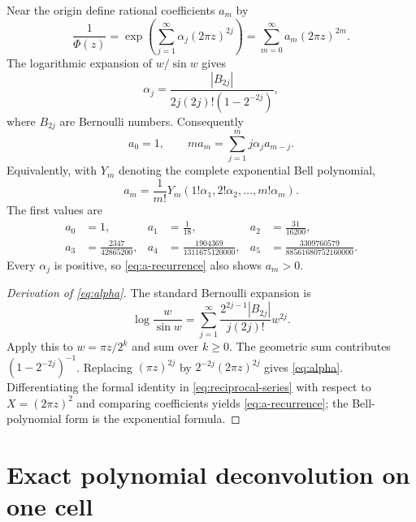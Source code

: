 \documentclass[11pt,oneside]{article}
\numberwithin{equation}{section}
\theoremstyle{definition}
\theoremstyle{remark}
\newcommand{\abs}[1]{\left|#1\right|}
\begin{document}
Near the origin define rational coefficients $a_m$ by
\begin{equation}
 \frac1{\Phi(z)}
 =\exp\!\left(\sum_{j=1}^{\infty}\alpha_j(2\pi z)^{2j}\right)
 =\sum_{m=0}^{\infty}a_m(2\pi z)^{2m}.
 \label{eq:reciprocal-series}
\end{equation}
The logarithmic expansion of $w/\sin w$ gives
\begin{equation}
 \alpha_j=\frac{\abs{B_{2j}}}
 {2j(2j)!\left(1-2^{-2j}\right)},
 \label{eq:alpha}
\end{equation}
where $B_{2j}$ are Bernoulli numbers.  Consequently
\begin{equation}
 a_0=1,
 \qquad
 ma_m=\sum_{j=1}^{m}j\alpha_j a_{m-j}.
 \label{eq:a-recurrence}
\end{equation}
Equivalently, with $Y_m$ denoting the complete exponential Bell polynomial,
\begin{equation}
 a_m=\frac1{m!}Y_m(1!\alpha_1,2!\alpha_2,\ldots,m!\alpha_m).
 \label{eq:a-Bell}
\end{equation}
The first values are
\begin{equation}
 \begin{aligned}
 a_0&=1,&
 a_1&=\frac1{18},&
 a_2&=\frac{31}{16200},\\
 a_3&=\frac{2347}{42865200},&
 a_4&=\frac{1904369}{1311675120000},&
 a_5&=\frac{3309760579}{88561680752160000}.
 \end{aligned}
 \label{eq:first-a}
\end{equation}
Every $\alpha_j$ is positive, so \eqref{eq:a-recurrence} also shows $a_m>0$.

\begin{proof}[Derivation of \eqref{eq:alpha}]
The standard Bernoulli expansion is
\[
 \log\frac{w}{\sin w}
 =\sum_{j=1}^{\infty}
 \frac{2^{2j-1}\abs{B_{2j}}}{j(2j)!}w^{2j}.
\]
Apply this to $w=\pi z/2^k$ and sum over $k\ge0$.  The geometric sum contributes
$(1-2^{-2j})^{-1}$.  Replacing $(\pi z)^{2j}$ by
$2^{-2j}(2\pi z)^{2j}$ gives \eqref{eq:alpha}.  Differentiating the formal
identity in \eqref{eq:reciprocal-series} with respect to
$X=(2\pi z)^2$ and comparing coefficients yields \eqref{eq:a-recurrence}; the
Bell-polynomial form is the exponential formula.
\end{proof}

\section{Exact polynomial deconvolution on one cell}
\end{document}
